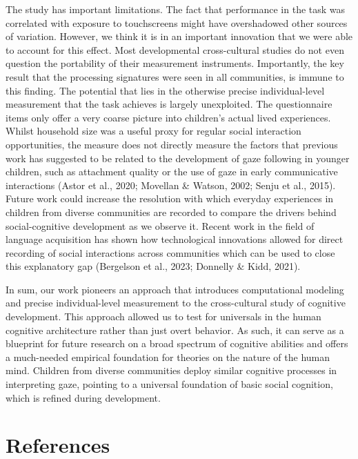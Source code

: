 \documentclass[
  man,floatsintext]{apa7}
\begin{document}
The study has important limitations. The fact that performance in the task was correlated with exposure to touchscreens might have overshadowed other sources of variation. However, we think it is in an important innovation that we were able to account for this effect. Most developmental cross-cultural studies do not even question the portability of their measurement instruments. Importantly, the key result that the processing signatures were seen in all communities, is immune to this finding. The potential that lies in the otherwise precise individual-level measurement that the task achieves is largely unexploited. The questionnaire items only offer a very coarse picture into children's actual lived experiences. Whilst household size was a useful proxy for regular social interaction opportunities, the measure does not directly measure the factors that previous work has suggested to be related to the development of gaze following in younger children, such as attachment quality or the use of gaze in early communicative interactions (Astor et al., 2020; Movellan \& Watson, 2002; Senju et al., 2015). Future work could increase the resolution with which everyday experiences in children from diverse communities are recorded to compare the drivers behind social-cognitive development as we observe it. Recent work in the field of language acquisition has shown how technological innovations allowed for direct recording of social interactions across communities which can be used to close this explanatory gap (Bergelson et al., 2023; Donnelly \& Kidd, 2021).

In sum, our work pioneers an approach that introduces computational modeling and precise individual-level measurement to the cross-cultural study of cognitive development. This approach allowed us to test for universals in the human cognitive architecture rather than just overt behavior. As such, it can serve as a blueprint for future research on a broad spectrum of cognitive abilities and offers a much-needed empirical foundation for theories on the nature of the human mind. Children from diverse communities deploy similar cognitive processes in interpreting gaze, pointing to a universal foundation of basic social cognition, which is refined during development.

\newpage

\section{References}\label{references}
\end{document}
